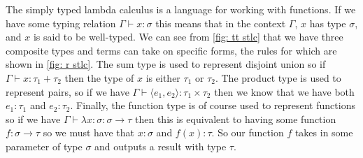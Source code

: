 \noindent
The simply typed lambda calculus is a language for working with functions. If we have some typing
relation $\Gamma \vdash x: \sigma$ this means that in the context $\Gamma$, $x$ has type $\sigma$,
and $x$ is said to be well-typed. We can see from \ref{fig: tt stlc} that we have three composite
types and terms can take on specific forms, the rules for which are shown in \ref{fig: r stlc}. The
sum type is used to represent disjoint union so if $\Gamma \vdash x: \tau_1 + \tau_2$ then the type 
of $x$ is either $\tau_1$ or $\tau_2$. The product type is used to represent pairs, so if we have
$\Gamma \vdash \langle e_1, e_2 \rangle : \tau_1 \times \tau_2$ then we know that we have both 
$e_1: \tau_1$ and $e_2: \tau_2$. Finally, the function type is of course used to represent functions
so if we have $\Gamma \vdash \lambda x: \sigma: \sigma \rightarrow \tau$ then this is equivalent to 
having some function $f : \sigma \rightarrow \tau$ so we must have that $x: \sigma$ and $f(x): \tau$. 
So our function $f$ takes in some parameter of type $\sigma$ and outputs a result with type $\tau$.
\\

